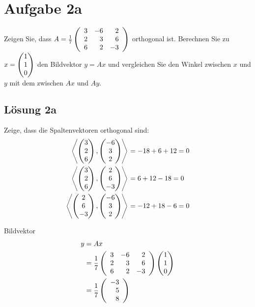 \documentclass[main.tex]{subfiles}
\begin{document}
\section{Aufgabe 2a}
Zeigen Sie, dass $A= \frac{1}{7} \eqmatrix{rrr}{
    3 & -6 & 2 \\
    2 &  3 & 6 \\
    6 &  2 & -3
}$ orthogonal ist. Berechnen Sie zu $x= \vektor{1 \\ 1 \\ 0}$ den Bildvektor $y=Ax$ und vergleichen Sie den Winkel zwischen $x$ und $y$ mit dem zwischen $Ax$ und $Ay$. 


\subsection{Lösung 2a}

Zeige, dass die Spaltenvektoren orthogonal sind:
\begin{align*}
    \scalarprod{\vektor{3 \\ 2 \\ 6}, \vektor{-6\\ 3\\ 2}} &= -18 + 6 + 12 = 0 \\
    \scalarprod{\vektor{3 \\ 2 \\ 6}, \vektor{2\\ 6\\ -3}} &= 6 + 12 - 18 = 0 \\
    \scalarprod{\vektor{2\\ 6\\ -3}, \vektor{-6\\ 3\\ 2}} &= -12 + 18 - 6 = 0 \\
\end{align*}

Bildvektor 
\begin{align*}
    y &= Ax \\
      &= \frac{1}{7} \eqmatrix{rrr}{
        3 & -6 & 2 \\
        2 &  3 & 6 \\
        6 &  2 & -3
      } \vektor{1 \\ 1 \\ 0} \\
      &= \frac{1}{7} \eqmatrix{r}{
        -3 \\
         5 \\
         8
      }
\end{align*}
\end{document}
